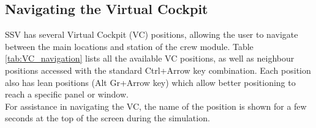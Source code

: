 \documentclass[Space_Shuttle_Vessel_Manual.tex]{subfiles}
\begin{document}
\begin{multicols*}{2}
\subsection{Navigating the Virtual Cockpit}
SSV has several Virtual Cockpit (VC) positions, allowing the user to navigate between the main locations and station of the crew module. Table \ref{tab:VC_navigation} lists all the available VC positions, as well as neighbour positions accessed with the standard Ctrl+Arrow key combination. Each position also has lean positions (Alt Gr+Arrow key) which allow better positioning to reach a specific panel or window.\\
For assistance in navigating the VC, the name of the position is shown for a few seconds at the top of the screen during the simulation.
\\

\end{multicols*}
\end{document}
